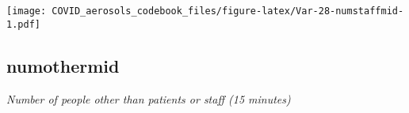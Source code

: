 \documentclass[]{article}
\begin{document}
\begin{minipage}{0.25 \textwidth}

\texttt{[image: COVID\_aerosols\_codebook\_files/figure-latex/Var-28-numstaffmid-1.pdf]}

\end{minipage}

\noindent\makebox[\linewidth]{\rule{\textwidth}{0.4pt}}

\hypertarget{numothermid}{%
\subsection{numothermid}\label{numothermid}}

\emph{Number of people other than patients or staff (15 minutes)}

\begin{minipage}{0.75 \textwidth}


\end{minipage}
\end{document}
